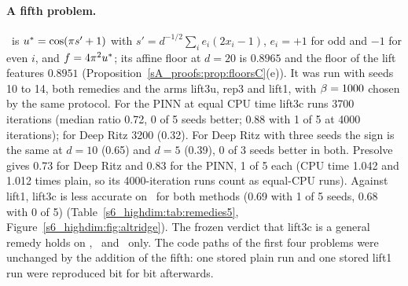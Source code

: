 \paragraph{A fifth problem.} \Paltridge\ is $u^{*}=\cos(\pi s'+1)$ with
$s'=d^{-1/2}\sum_ie_i(2x_i-1)$, $e_i=+1$ for odd and $-1$ for even $i$, and $f=4\pi^2u^{*}$; its
affine floor at $d=20$ is $0.8965$ and the floor of the lift features $0.8951$
(Proposition~\ref{sA_proofs:prop:floorsC}(e)). It was run with seeds 10 to 14, both remedies and
the arms lift3u, rep3 and lift1, with $\beta=1000$ chosen by the same protocol.
For the PINN at equal CPU time lift3c runs 3700 iterations (median ratio 0.72, 0 of 5 seeds
better; 0.88 with 1 of 5 at 4000 iterations); for Deep Ritz 3200 (0.32). For Deep Ritz with three
seeds the sign is the same at $d=10$ (0.65) and $d=5$ (0.39), 0 of 3 seeds better in both.
Presolve gives 0.73 for Deep Ritz and 0.83 for the PINN, 1 of 5 each (CPU time 1.042 and 1.012
times plain, so its 4000-iteration runs count as equal-CPU runs). Against lift1, lift3c is less
accurate on \Paltridge\ for both methods (0.69 with 1 of 5 seeds, 0.68 with 0 of 5)
(Table~\ref{s6_highdim:tab:remedies5}, Figure~\ref{s6_highdim:fig:altridge}).
The frozen verdict that lift3c is a general remedy holds on \Pone, \Pridge\ and \Pcospair\ only.
The code paths of the first four problems were unchanged by the addition of the fifth: one stored
plain run and one stored lift1 run were reproduced bit for bit afterwards.

